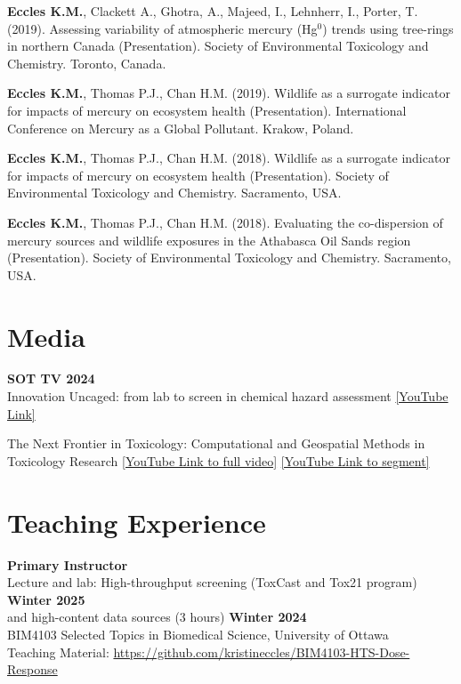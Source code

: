 \documentclass[margin,line]{res}
\begin{document}
\begin{resume}
\textbf{Eccles K.M.}, Clackett A., Ghotra, A., Majeed, I., Lehnherr, I., Porter, T. (2019). Assessing variability of atmospheric mercury (Hg$^{0}$) trends using tree-rings in northern Canada (Presentation). Society of Environmental Toxicology and Chemistry. Toronto, Canada.

\textbf{Eccles K.M.}, Thomas P.J., Chan H.M. (2019). Wildlife as a surrogate indicator for impacts of mercury on ecosystem health (Presentation). International Conference on Mercury as a Global Pollutant. Krakow, Poland.

\textbf{Eccles K.M.}, Thomas P.J., Chan H.M. (2018). Wildlife as a surrogate indicator for impacts of mercury on ecosystem health (Presentation). Society of Environmental Toxicology and Chemistry. Sacramento, USA.

\textbf{Eccles K.M.}, Thomas P.J., Chan H.M. (2018). Evaluating the co-dispersion of mercury sources and wildlife exposures in the Athabasca Oil Sands region (Presentation). Society of Environmental Toxicology and Chemistry. Sacramento, USA.


\vspace*{.1in}
\section{\sc Media}
\textbf{SOT TV 2024}\\
Innovation Uncaged: from lab to screen in chemical hazard assessment \href{https://www.youtube.com/watch?v=6Pg7DvoHgP0}{[YouTube Link]}

The Next Frontier in Toxicology: Computational and Geospatial Methods in Toxicology Research \href{https://www.youtube.com/watch?v=-vlSMeWfeKs\&t=939s}{[YouTube Link to full video]}
\href{https://www.youtube.com/watch?v=vgu6d1uT8K4}{[YouTube Link to segment]}


\vspace*{.1in}
\section{\sc Teaching Experience}
\textbf{Primary Instructor}\\
Lecture and lab: High-throughput screening (ToxCast and Tox21 program) \hfill {\textbf{Winter 2025}}\\
and high-content data sources (3 hours) \hfill {\textbf{Winter 2024}}\\
BIM4103 Selected Topics in Biomedical Science, University of Ottawa\\
Teaching Material: \url{https://github.com/kristineccles/BIM4103-HTS-Dose-Response}


\end{resume}
\end{document}
